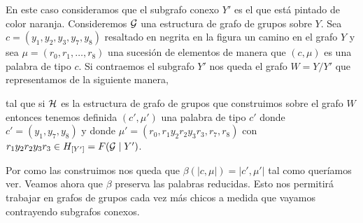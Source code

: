 \documentclass[tesis.tex]{subfiles}
\begin{document}
\begin{ej}
	En este caso consideramos que el subgrafo conexo $Y'$ es el que está pintado de color \textcolor{carrotorange}{naranja}.
	Consideremos ${\cal G}$ una estructura de grafo de grupos sobre $Y$.
	Sea $c = (y_1, y_2, y_3, y_7, y_8)$ resaltado en negrita en la figura un camino en el grafo $Y$ y sea $\mu = (r_0, r_1, \dots, r_8)$ una sucesión de elementos de manera que $(c, \mu)$ es una palabra de tipo $c$.
	Si contraemos el subgrafo $Y'$ nos queda el grafo $W=Y/Y'$ que representamos de la siguiente manera,
	\begin{center}
	\end{center}
	tal que si ${\cal H}$ es la estructura de grafo de grupos que construimos sobre el grafo $W$ entonces tenemos definida $(c', \mu')$ una palabra de tipo $c'$ donde
	 $c' = (y_1,y_7,y_8)$ y donde $\mu'=(r_0,r_1y_2r_2y_3r_3,r_7,r_8)$ con $r_1y_2r_2y_3r_3 \in H_{[Y']} = F({\cal G} \mid Y')$.
\end{ej}

Por como las construimos nos queda que $\beta(|c,\mu|) = |c',\mu'|$ tal como queríamos ver.
Veamos ahora que $\beta$ preserva las palabras reducidas. 
Esto nos permitirá trabajar en grafos de grupos cada vez más chicos a medida que vayamos contrayendo subgrafos conexos.
\end{document}
